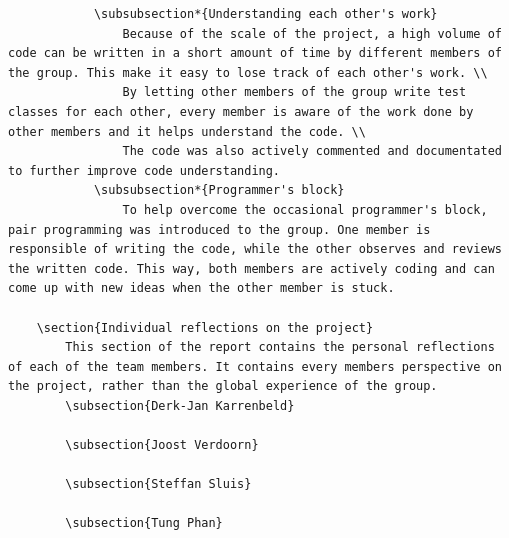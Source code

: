 \documentclass[10pt,a4paper]{report}
\begin{document}
\begin{lstlisting}
			\subsubsection*{Understanding each other's work}
				Because of the scale of the project, a high volume of code can be written in a short amount of time by different members of the group. This make it easy to lose track of each other's work. \\
				By letting other members of the group write test classes for each other, every member is aware of the work done by other members and it helps understand the code. \\
				The code was also actively commented and documentated to further improve code understanding.
			\subsubsection*{Programmer's block}
				To help overcome the occasional programmer's block, pair programming was introduced to the group. One member is responsible of writing the code, while the other observes and reviews the written code. This way, both members are actively coding and can come up with new ideas when the other member is stuck.

	\section{Individual reflections on the project}
		This section of the report contains the personal reflections of each of the team members. It contains every members perspective on the project, rather than the global experience of the group.
		\subsection{Derk-Jan Karrenbeld}
			
		\subsection{Joost Verdoorn}
			
		\subsection{Steffan Sluis}
			
		\subsection{Tung Phan}
			

\end{lstlisting}
\end{document}
